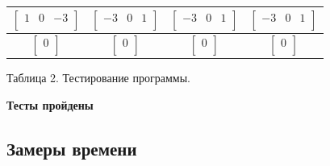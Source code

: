 \documentclass[a4paper,14pt]{article} %
\begin{document}
\begin{center}
\begin{tabular}{  | c | c | c | c |}
			$\begin{bmatrix} 
   			1&0&-3 \\
			\end{bmatrix}$ & 
			$\begin{bmatrix} 
   			-3&0&1 \\
			\end{bmatrix}$ & 
			$\begin{bmatrix} 
   			-3&0&1 \\
			\end{bmatrix}$ & 
			$\begin{bmatrix} 
   			-3&0&1 \\
			\end{bmatrix}$ \\
			\hline
			
			$\begin{bmatrix} 
   			0 \\
			\end{bmatrix}$ & 
			$\begin{bmatrix} 
   			0 \\
			\end{bmatrix}$ & 
			$\begin{bmatrix} 
   			0 \\
			\end{bmatrix}$ & 
			$\begin{bmatrix} 
   			0 \\
			\end{bmatrix}$ \\
			\hline
		\end{tabular}
		
		\hfill
		
		Таблица 2.
		Тестирование программы.   
	\end{center}
        
	\hfill
		
	
	\textbf{Тесты пройдены}

	\subsection{Замеры времени}
	\hfill
	
\end{document}
